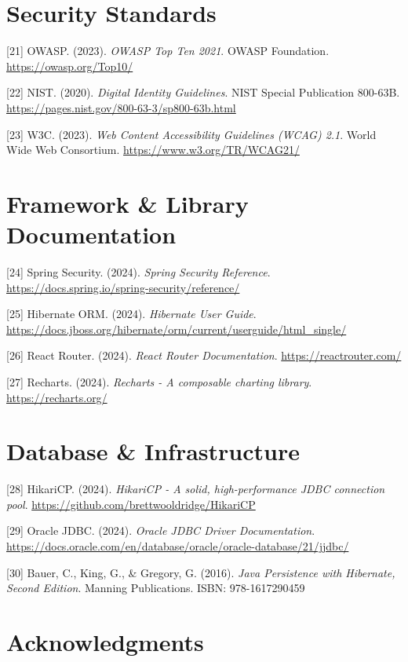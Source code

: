\documentclass[
  12pt,
  a4paperpaper,
]{report}
\begin{document}
\section{Security Standards}\label{security-standards}

{[}21{]} OWASP. (2023). \emph{OWASP Top Ten 2021}. OWASP Foundation.
\url{https://owasp.org/Top10/}

{[}22{]} NIST. (2020). \emph{Digital Identity Guidelines}. NIST Special
Publication 800-63B. \url{https://pages.nist.gov/800-63-3/sp800-63b.html}

{[}23{]} W3C. (2023). \emph{Web Content Accessibility Guidelines (WCAG)
2.1}. World Wide Web Consortium. \url{https://www.w3.org/TR/WCAG21/}


\section{Framework \& Library
Documentation}\label{framework-library-documentation}

{[}24{]} Spring Security. (2024). \emph{Spring Security Reference}.
\url{https://docs.spring.io/spring-security/reference/}

{[}25{]} Hibernate ORM. (2024). \emph{Hibernate User Guide}.
\url{https://docs.jboss.org/hibernate/orm/current/userguide/html_single/}

{[}26{]} React Router. (2024). \emph{React Router Documentation}.
\url{https://reactrouter.com/}

{[}27{]} Recharts. (2024). \emph{Recharts - A composable charting
library}. \url{https://recharts.org/}


\section{Database \& Infrastructure}\label{database-infrastructure-1}

{[}28{]} HikariCP. (2024). \emph{HikariCP - A solid, high-performance
JDBC connection pool}. \url{https://github.com/brettwooldridge/HikariCP}

{[}29{]} Oracle JDBC. (2024). \emph{Oracle JDBC Driver Documentation}.
\url{https://docs.oracle.com/en/database/oracle/oracle-database/21/jjdbc/}

{[}30{]} Bauer, C., King, G., \& Gregory, G. (2016). \emph{Java
Persistence with Hibernate, Second Edition}. Manning Publications.
ISBN: 978-1617290459


\section{Acknowledgments}\label{acknowledgments}
\end{document}
